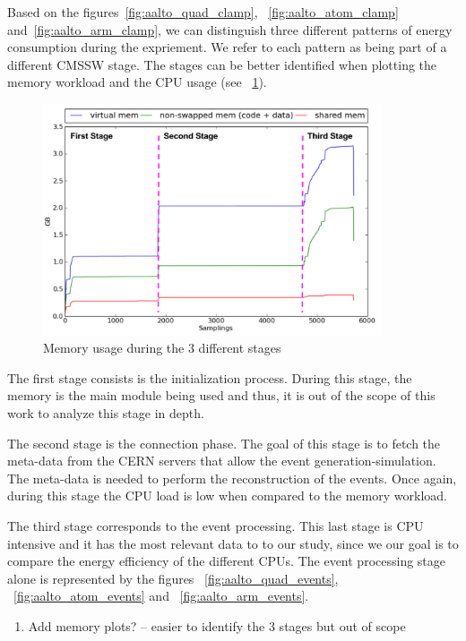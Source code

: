 Based on the figures~\ref{fig:aalto_quad_clamp}, ~\ref{fig:aalto_atom_clamp} 
and~\ref{fig:aalto_arm_clamp}, we can distinguish three different patterns of energy consumption during the expriement. 
We refer to each pattern as being part of a different CMSSW stage. The stages can be better identified 
when plotting the memory workload and the CPU usage (see ~\ref{fig:memory_stages}).

\begin{figure}[h]
  \centering
    \includegraphics[width=100mm]{"img/aalto/memory_stages"}
    \caption{Memory usage during the 3 different stages}
    \label{fig:memory_stages}
\end{figure}

The first stage consists is the initialization process. During this stage, the memory is the main module being used and thus, it is out of the scope of this work to analyze this stage in depth. 

The second stage is the connection phase. The goal of this stage is to fetch the meta-data from
the CERN servers that allow the event generation-simulation. The meta-data is needed to perform the reconstruction of the events. Once again, 
during this stage the CPU load is low when compared to the memory workload. 

The third stage corresponds to the event processing. This last stage is CPU intensive and it has the most relevant data to to our study, since we our goal is to compare the energy efficiency of the different CPUs. The event processing stage alone is represented by 
the figures ~\ref{fig:aalto_quad_events}, ~\ref{fig:aalto_atom_events} and ~\ref{fig:aalto_arm_events}.

\begin{enumerate}
\item Add memory plots? -- easier to identify the 3 stages but out of scope
\end{enumerate}

